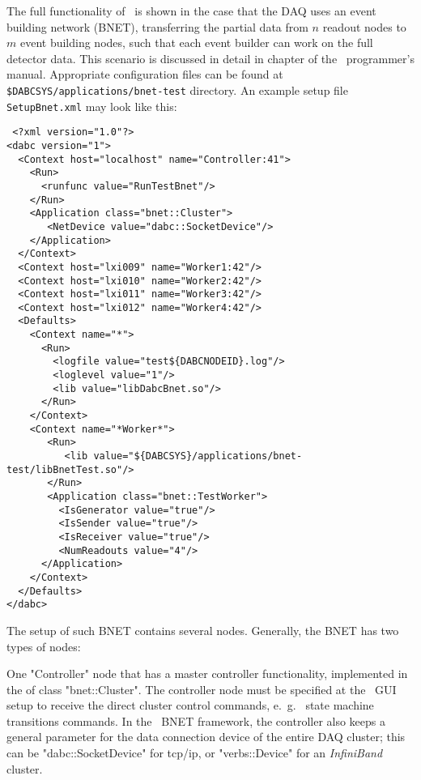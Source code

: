 The full functionality of \dabc\ is shown in the case that the DAQ uses
an event building network (BNET), transferring the partial data from $n$ readout nodes
to $m$ event building nodes, such that each event builder can work on the full
detector data. This scenario is discussed in detail in chapter 
of the \dabc\ programmer's manual. Appropriate configuration files can be found at \\
{\tt \$DABCSYS/applications/bnet-test} directory.
An example setup file {\tt SetupBnet.xml} may look like this:

\begin{small}
\begin{verbatim}
 <?xml version="1.0"?>
<dabc version="1">
  <Context host="localhost" name="Controller:41">
    <Run>
      <runfunc value="RunTestBnet"/>
    </Run>
    <Application class="bnet::Cluster">
       <NetDevice value="dabc::SocketDevice"/>
    </Application>
  </Context>
  <Context host="lxi009" name="Worker1:42"/>
  <Context host="lxi010" name="Worker2:42"/>
  <Context host="lxi011" name="Worker3:42"/>
  <Context host="lxi012" name="Worker4:42"/>
  <Defaults>
    <Context name="*">
      <Run>
        <logfile value="test${DABCNODEID}.log"/>
        <loglevel value="1"/>
        <lib value="libDabcBnet.so"/>
      </Run>
    </Context>
    <Context name="*Worker*">
       <Run>
          <lib value="${DABCSYS}/applications/bnet-test/libBnetTest.so"/>
       </Run>
       <Application class="bnet::TestWorker">
         <IsGenerator value="true"/>
         <IsSender value="true"/>
         <IsReceiver value="true"/>
         <NumReadouts value="4"/>
      </Application>       
    </Context>
  </Defaults>
</dabc>
\end{verbatim}
\end{small}

The setup of such BNET contains several  nodes. Generally, the
BNET has two types of nodes: 
\bbul
\item One "Controller" node that has a master
controller functionality, implemented in the  of
class "bnet::Cluster". The controller node must be specified at the \dabc\ GUI setup
to receive the direct cluster control commands, e.~g.~ state machine transitions commands. In the \dabc\ BNET framework, the controller also keeps a general
parameter  for the data connection device of the entire DAQ cluster;
this can be "dabc::SocketDevice" for tcp/ip, or "verbs::Device" for an {\em InfiniBand}
cluster.

